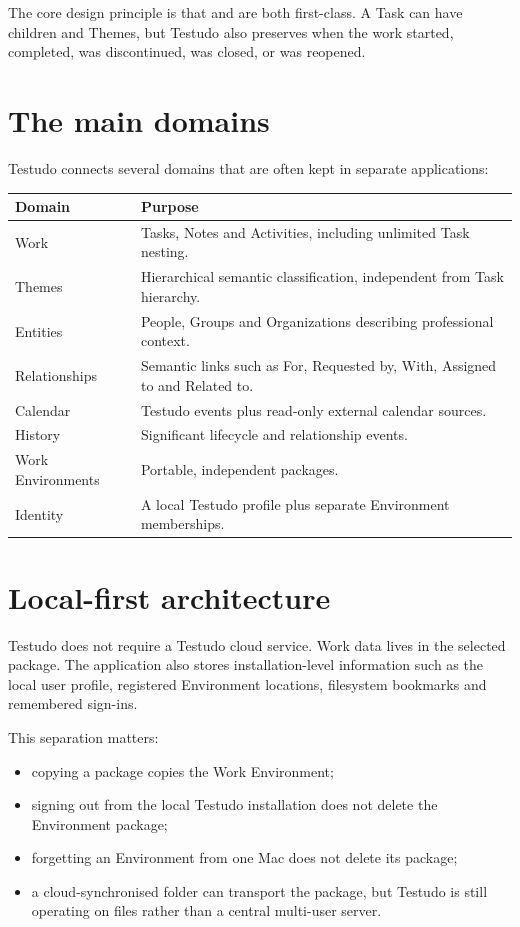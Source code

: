 \documentclass{testudomanual}
\begin{document}
The core design principle is that  and  are both first-class. A Task can have children and Themes, but Testudo also preserves when the work started, completed, was discontinued, was closed, or was reopened.

\section{The main domains}

Testudo connects several domains that are often kept in separate applications:

\begin{longtable}{L{0.25\textwidth} L{0.65\textwidth}}
\toprule
\textbf{Domain} & \textbf{Purpose} \\
\midrule
\endhead
Work & Tasks, Notes and Activities, including unlimited Task nesting. \\
Themes & Hierarchical semantic classification, independent from Task hierarchy. \\
Entities & People, Groups and Organizations describing professional context. \\
Relationships & Semantic links such as For, Requested by, With, Assigned to and Related to. \\
Calendar & Testudo events plus read-only external calendar sources. \\
History & Significant lifecycle and relationship events. \\
Work Environments & Portable, independent  packages. \\
Identity & A local Testudo profile plus separate Environment memberships. \\
\bottomrule
\end{longtable}

\section{Local-first architecture}

Testudo does not require a Testudo cloud service. Work data lives in the selected  package. The application also stores installation-level information such as the local user profile, registered Environment locations, filesystem bookmarks and remembered sign-ins.

This separation matters:
\begin{itemize}
    \item copying a  package copies the Work Environment;
    \item signing out from the local Testudo installation does not delete the Environment package;
    \item forgetting an Environment from one Mac does not delete its package;
    \item a cloud-synchronised folder can transport the package, but Testudo is still operating on files rather than a central multi-user server.
\end{itemize}
\end{document}
